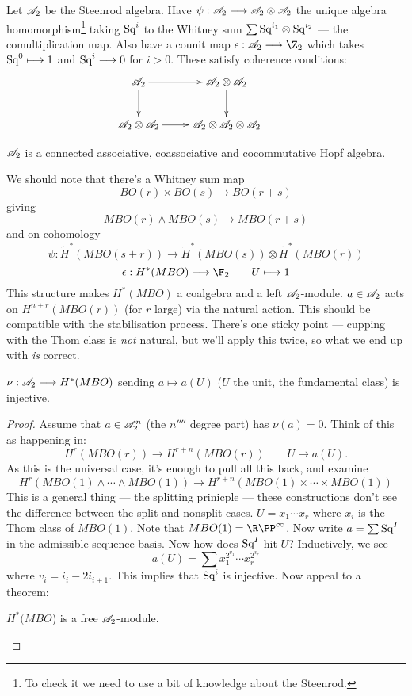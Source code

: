 \documentclass[11pt]{article}
\begin{document}
\begin{JeremyThomPracticeTalk}
Let $\mathscr{A}_2$ be the Steenrod algebra. Have $\psi:\mathscr{A}_2\longrightarrow\mathscr{A}_2\otimes\mathscr{A}_2$ the unique algebra homomorphism\footnote{To check it we need to use a bit of knowledge about the Steenrod.} taking $\textup{Sq}^i$ to the Whitney sum $\sum \textup{Sq}^{i_1}\otimes\textup{Sq}^{i_2}$ --- the comultiplication map. Also have a counit map $\epsilon:\Steen\to\Z_2$ which takes $\textup{Sq}^0\longmapsto 1$ and $\textup{Sq}^i\longrightarrow0$ for $i>0$. These satisfy coherence conditions:
\[\xymatrix{\Steen\ar[r]\ar[d]&\Steen\otimes\Steen\ar[d]&\\
\Steen\otimes\Steen\ar[r]&\Steen\otimes\Steen\otimes\Steen}\]
\begin{fact*}
$\mathscr{A}_2$ is a connected associative, coassociative and cocommutative Hopf algebra.
\end{fact*}
We should note that there's a Whitney sum map 
\[BO(r)\times BO(s)\to BO(r+s)\]
giving
\[MBO(r)\wedge MBO(s)\to MBO(r+s)\]
and on cohomology
\[\psi:\widetilde H^* (MBO(s+r))\to \widetilde H^*( MBO(s))\otimes \widetilde H^* (MBO(r))\]
\[\epsilon: H^*(MBO)\to\F_2\qquad U\mapsto 1\]
This structure makes $H^*(MBO)$ a coalgebra and a left $\mathscr{A}_2$-module. $a\in\mathscr{A}_2$ acts on $H^{n+r}(MBO(r))$ (for $r$ large) via the natural action. This should be compatible with the stabilisation process. There's one sticky point --- cupping with the Thom class is \emph{not} natural, but we'll apply this twice, so what we end up with \emph{is} correct.
\begin{prop*}
$\nu:\mathscr{A}_2\longrightarrow H^*(MBO)$ sending $a\mapsto a(U)$ ($U$ the unit, the fundamental class) is injective.
\end{prop*}
\begin{proof}
Assume that $a\in\mathscr{A}_2^n$ (the $n\fourth$ degree part) has $\nu(a)=0$. Think of this as happening in:
\[H^r(MBO(r))\to H^{r+n}(MBO(r))\qquad U\mapsto a(U).\]
As this is the universal case, it's enough to pull all this back, and examine
\[H^r(MBO(1)\wedge\cdots\wedge MBO(1))\to H^{r+n}(MBO(1)\times\cdots\times MBO(1))\]
This is a general thing --- the splitting prinicple --- these constructions don't see the difference between the split and nonsplit cases. $U=x_1\cdots x_r$ where $x_i$ is the Thom class of $MBO(1)$. Note that $MBO(1)=\RP^\infty$. Now write $a=\sum \textup{Sq}^I$ in the admissible sequence basis. Now how does $\textup{Sq}^I$ hit $U$? Inductively, we see
\[a(U)=\sum x_1^{2^{v_1}}\cdots x_r^{2^{v_r}}\]
where $v_i=i_i-2i_{i+1}$. This implies that $\textup{Sq}^i$ is injective. Now appeal to a theorem:
\begin{thm*}
$H^*(MBO$) is a free $\mathscr{A}_2$-module.
\end{thm*}

\end{proof}
\end{JeremyThomPracticeTalk}
\end{document}
